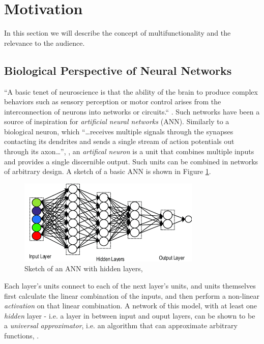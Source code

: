 \section*{Motivation}

In this section we will describe the concept of multifunctionality and the relevance to the audience.

\subsection*{Biological Perspective of Neural Networks}
``A basic tenet of neuroscience is that the ability of the brain to produce complex behaviors such as sensory perception or motor control arises from the interconnection of neurons into networks or circuits.`` \cite{gettingEmergingPrinciplesGoverning1989}. 
Such networks have been a source of inspiration for \textit{artificial neural networks} (ANN). Similarly to a biological neuron, which ``\dots receives multiple signals through the synapses contacting its dendrites and sends a single stream of action potentials out through its axon\dots'', \cite{kriegeskorteNeuralNetworkModels2019}, an \textit{artifical neuron} is a unit that combines multiple inputs and provides a single discernible output. Such units can be combined in networks of arbitrary design. 
A sketch of a basic ANN is shown in Figure \ref{fig:neutral-network-diagram}.
\begin{figure}[!b]
    \begin{center}
    \includegraphics[scale=0.5]{Images/neutral-network-diagram.png}
    \caption{Sketch of an ANN with hidden layers, \cite{dumorEstimatingChinaTrade2019}}
    \label{fig:neutral-network-diagram}
    \end{center}
\end{figure}
Each layer's units connect to each of the next layer's units, and units themselves first calculate the linear combination of the inputs, and then perform a non-linear \textit{activation} on that linear combination. A network of this model, with at least one \textit{hidden} layer - i.e. a layer in between input and ouput layers, can be shown to be a \textit{universal approximator}, i.e. an algorithm that can approximate arbitrary functions, \cite{scarselliUniversalApproximationUsing1998}.

